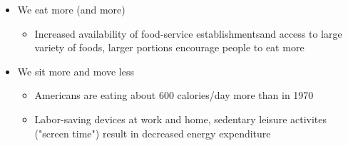 \documentclass[12pt]{article}
\begin{document}
\begin{itemize}
                \item We eat more (and more)
                    \begin{itemize}
                        \item Increased availability of food-service establishmentsand access to large variety of foods, larger portions encourage people to eat more
                    \end{itemize}
                \item We sit more and move less
                    \begin{itemize}
                        \item Americans are eating about 600 calories/day more than in 1970
                        \item Labor-saving devices at work and home, sedentary leisure activites ("screen time") result in decreased energy expenditure
                    \end{itemize}
            \end{itemize}
\end{document}
